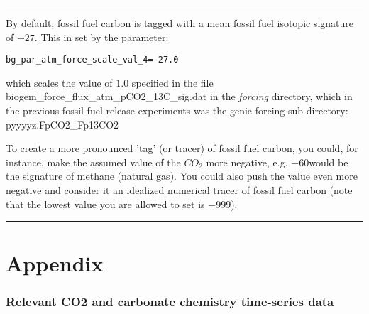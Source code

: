 \vspace{1mm} \noindent\rule{4cm}{0.1mm} \vspace{2mm}

\noindent By default, fossil fuel carbon is tagged with a mean fossil fuel isotopic signature of \(-27\)\permille. This in set by the parameter:
\vspace{-1mm}\small\begin{verbatim}
bg_par_atm_force_scale_val_4=-27.0
\end{verbatim}\normalsize\vspace{-1mm}
which scales the value of \(1.0\) specified in the file \textsf{\footnotesize biogem\_force\_flux\_atm\_pCO2\_13C\_sig.dat} in the \textit{forcing} directory, which in the previous fossil fuel release experiments was the \textsf{\footnotesize genie-forcing} sub-directory: \textsf{\footnotesize pyyyyz.FpCO2\_Fp13CO2}

\vspace{1mm}

To create a more pronounced 'tag' (or tracer) of fossil fuel carbon, you could, for instance, make the assumed value of the \(CO_{2}\) more negative, e.g. \(-60\)\permille would be the signature of methane (natural gas). You could also push the value even more negative and consider it an idealized numerical tracer of fossil fuel carbon (note that the lowest value you are allowed to set is \(-999\)\permille).

\vspace{1mm} \noindent\rule{4cm}{0.1mm} \vspace{2mm}

\newpage

\section{Appendix}

\subsubsection{Relevant CO2 and carbonate chemistry time-series data}

